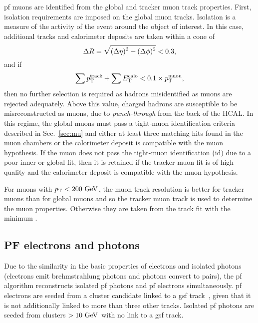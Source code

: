 \acrshort{pf} muons are identified from the global and tracker muon track properties.
First, isolation requirements are imposed on the global muon tracks.
Isolation is a measure of the activity of the event around the object of interest.
In this case, additional tracks and calorimeter deposits are taken within a cone of 
\begin{equation}
	\Delta R=\sqrt{\smash[b]{(\Delta\eta)^2+(\Delta\phi)^2}} < 0.3,
\end{equation}
and if 
\begin{equation*}
	\sum p_{\mathrm{T}}^{\text{track}}+\sum E_{\mathrm{T}}^{\text{calo}} < 0.1\times p_{\mathrm{T}}^{\text{muon}},
\end{equation*}
then no further selection is required as hadrons misidentified as muons are rejected adequately.
Above this value, charged hadrons are susceptible to be misreconstructed as muons, due to \textit{punch-through} from the back of the HCAL.
In this regime, the global muons must pass a tight-muon identification criteria described in Sec.~\ref{sec:mu} and either at least three matching hits found in the muon chambers or the calorimeter deposit is compatible with the muon hypothesis.
If the muon does not pass the tight-muon identification (\acrshort{id}) due to a poor inner or global fit, then it is retained if the tracker muon fit is of high quality and the calorimeter deposit is compatible with the muon hypothesis.

For muons with $p_{\mathrm{T}}<200\mathrm{~Ge\hspace{-.08em}V}^{}$, the muon track resolution is better for tracker muons than for global muons and so the tracker muon track is used to determine the muon properties.
Otherwise they are taken from the track fit with the minimum \chisq{}.

\subsection{PF electrons and photons} %
\label{sub:pf_electrons_and_photons}

Due to the similarity in the basic properties of electrons and isolated photons (electrons emit brehmstrahlung photons and photons convert to \electronp{}\electronm{} pairs), the \acrshort{pf} algorithm reconstructs isolated \acrshort{pf} photons and \acrshort{pf} electrons simultaneously.
\acrshort{pf} electrons are seeded from a cluster candidate linked to a \acrfull{gsf} track~\cite{Event:GSF}, given that it is not additionally linked to more than three other tracks.
Isolated \acrshort{pf} photons are seeded from clusters $>10\mathrm{~Ge\hspace{-.08em}V}^{}$ with no link to a \acrshort{gsf} track.

